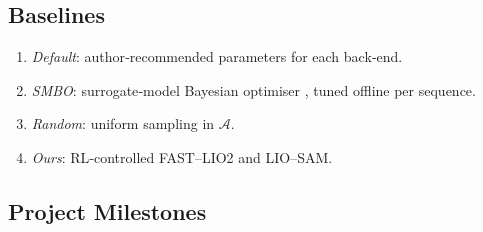 \documentclass[12pt]{article}
\begin{document}
\subsection{Baselines}

\begin{enumerate}
  \item \emph{Default}: author‑recommended parameters for each back‑end.
  \item \emph{SMBO}: surrogate‑model Bayesian optimiser \cite{koide_2021_adaptive}, tuned offline per sequence.
  \item \emph{Random}: uniform sampling in $\mathcal{A}$.
  \item \emph{Ours}: RL‑controlled FAST--LIO2 and LIO--SAM.
\end{enumerate}

\subsection{Project Milestones}
\end{document}
